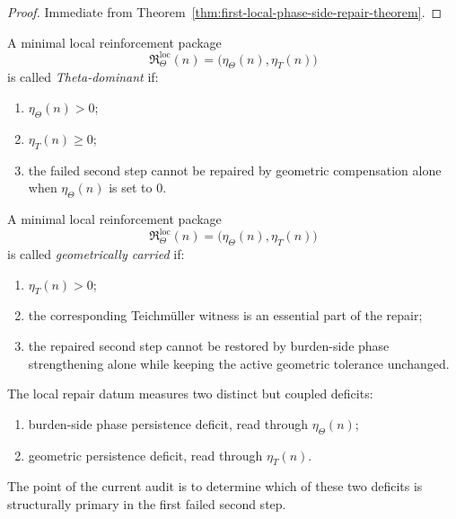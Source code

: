 \begin{proof}
Immediate from Theorem~\ref{thm:first-local-phase-side-repair-theorem}.
\end{proof}


\begin{definition}
\label{def:theta-dominant-local-repair}
A minimal local reinforcement package
\[
\mathfrak{R}_{\Theta}^{\mathrm{loc}}(n)
=
\bigl(
\eta_{\Theta}(n),
\eta_{T}(n)
\bigr)
\]
is called \emph{Theta-dominant} if:
\begin{enumerate}
    \item \(\eta_{\Theta}(n) > 0\);
    \item \(\eta_{T}(n)\ge 0\);
    \item the failed second step cannot be repaired by geometric compensation alone when \(\eta_{\Theta}(n)\) is set to \(0\).
\end{enumerate}
\end{definition}

\begin{definition}
\label{def:geometrically-carried-local-repair}
A minimal local reinforcement package
\[
\mathfrak{R}_{\Theta}^{\mathrm{loc}}(n)
=
\bigl(
\eta_{\Theta}(n),
\eta_{T}(n)
\bigr)
\]
is called \emph{geometrically carried} if:
\begin{enumerate}
    \item \(\eta_{T}(n) > 0\);
    \item the corresponding Teichm\"uller witness is an essential part of the repair;
    \item the repaired second step cannot be restored by burden-side phase strengthening alone while keeping the active geometric tolerance unchanged.
\end{enumerate}
\end{definition}

\begin{remark}
\label{rem:two-sided-reading-of-the-repair-datum}
The local repair datum measures two distinct but coupled deficits:
\begin{enumerate}
    \item burden-side phase persistence deficit, read through \(\eta_{\Theta}(n)\);
    \item geometric persistence deficit, read through \(\eta_{T}(n)\).
\end{enumerate}
The point of the current audit is to determine which of these two deficits is structurally primary in the first failed second step.
\end{remark}

